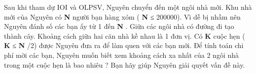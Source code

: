 Sau khi tham dự IOI và OLPSV, Nguyên chuyển đến một ngôi nhà mới. Khu nhà mới của Nguyên có \textbf{ N } người bạn hàng xóm ( \textbf{ N } ≤ 200000). Vì dễ bị nhầm nên Nguyên đánh số các bạn ấy từ 1 đến \textbf{ N } . Giữa các ngôi nhà có đường đi tạo thành cây. Khoảng cách giữa hai căn nhà kề nhau là 1 đơn vị. Có \textbf{ K } cuộc hẹn ( \textbf{ K } ≤ \textbf{ N } /2) được Nguyên đưa ra để làm quen với các bạn mới. Để tính toán chi phí mời các bạn, Nguyên muốn biết xem khoảng cách xa nhất của 2 ngôi nhà trong một cuộc hẹn là bao nhiêu ? Bạn hãy giúp Nguyên giải quyết vấn đề này.